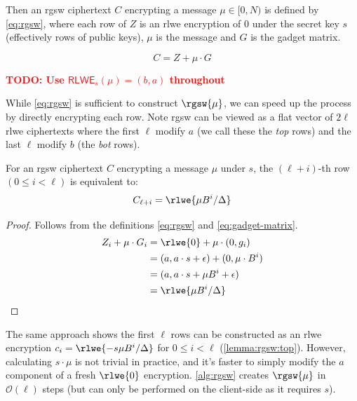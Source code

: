 Then an \gls{rgsw} ciphertext $C$ encrypting a message $\mu \in [0, N)$ is defined by \eqref{eq:rgsw}, where each row of $Z$ is an \gls{rlwe} encryption of 0 under the secret key $s$ (effectively rows of public keys), $\mu$ is the message and $G$ is the gadget matrix.

\begin{equation}
    \label{eq:rgsw}
    C = Z + \mu \cdot G
\end{equation}

\ifnotes
\noindent\textcolor{red}{\textbf{TODO: Use $\mathsf{RLWE}_s(\mu) = (b, a)$ throughout}}
\fi

While \eqref{eq:rgsw} is sufficient to construct $\rgsw{\mu}$, we can speed up the process by directly encrypting each row. Note \gls{rgsw} can be viewed as a flat vector of $2\ell$ \gls{rlwe} ciphertexts where the first $\ell$ modify $a$ (we call these the \emph{top} rows) and the last $\ell$ modify $b$ (the \emph{bot} rows).

\begin{corollary}
\label{corollary:rgsw:bottom}
For an \gls{rgsw} ciphertext $C$ encrypting a message $\mu$ under $s$, the $(\ell + i)$-th row $(0 \leq i < \ell)$ is equivalent to:
\begin{equation}
    C_{\ell + i} = \rlwe{\mu B^i / \Delta}
\end{equation}

\begin{proof}
    Follows from the definitions \eqref{eq:rgsw} and \eqref{eq:gadget-matrix}.
    \begin{align*}
        Z_i + \mu\cdot G_i &= \rlwe{0} + \mu \cdot(0, g_i) \\
            &= (a, a\cdot s + \epsilon) + (0, \mu\cdot B^i) \\
            &= (a, a\cdot s + \mu B^i + \epsilon) \\
            &= \rlwe{\mu B^i/\Delta}
    \end{align*}
\end{proof}
\end{corollary}

\noindent The same approach shows the first $\ell$ rows can be constructed as an \gls{rlwe} encryption $c_i = \rlwe{-s\mu B^i/\Delta}$ for $0 \leq i <\ell$ (\autoref{lemma:rgsw:top}). However, calculating $s\cdot \mu$ is not trivial in practice, and it's faster to simply modify the $a$ component of a fresh $\rlwe{0}$ encryption. \autoref{alg:rgsw} creates $\rgsw{\mu}$ in $\mathcal{O}(\ell)$ steps (but can only be performed on the client-side as it requires $s$).

